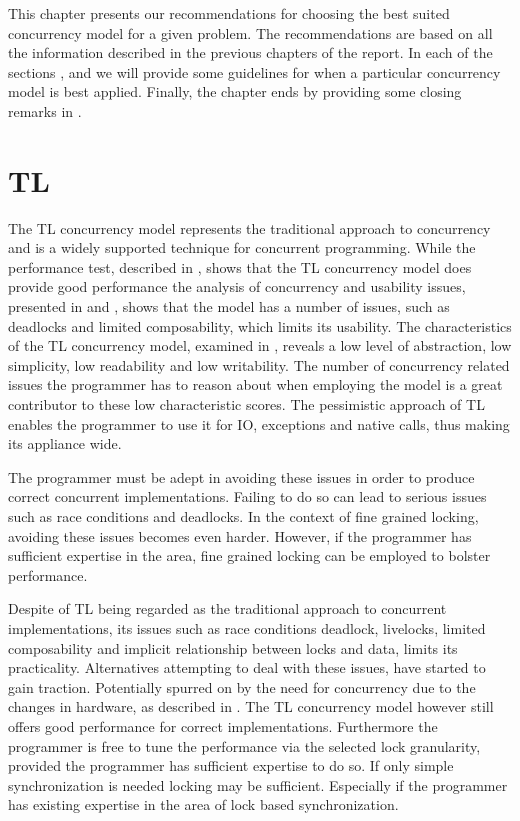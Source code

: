 \makeatletter {}\makeatother
{}
This chapter presents our recommendations for choosing the best suited concurrency model for a given problem. The recommendations are based on all the information described in the previous chapters of the report. In each of the sections ,  and  we will provide some guidelines for when a particular concurrency model is best applied. Finally, the chapter ends by providing some closing remarks in .
\label{chap:choosing_con_model}

\section{\acl{TL}}\label{sec:choose_TL}
The \ac{TL} concurrency model represents the traditional approach to concurrency\cite{saha2006mcrt} and is a widely supported technique for concurrent programming. While the performance test, described in , shows that the \ac{TL} concurrency model does provide good performance the analysis of concurrency and usability issues, presented in  and , shows that the model has a number of issues, such as deadlocks and limited composability, which limits its usability. The characteristics of the \ac{TL} concurrency model, examined in , reveals a low level of abstraction, low simplicity, low readability and low writability. The number of concurrency related issues the programmer has to reason about when employing the model is a great contributor to these low characteristic scores. The pessimistic approach of \ac{TL} enables the programmer to use it for \ac{IO}, exceptions and native calls, thus making its appliance wide.

The programmer must be adept in avoiding these issues in order to produce correct concurrent implementations. Failing to do so can lead to serious issues such as race conditions and deadlocks. In the context of fine grained locking, avoiding these issues becomes even harder. However, if the programmer has sufficient expertise in the area, fine grained locking can be employed to bolster performance. 

Despite of \ac{TL} being regarded as the traditional approach to concurrent implementations, its issues such as race conditions deadlock, livelocks, limited composability and implicit relationship between locks and data, limits its practicality. Alternatives attempting to deal with these issues, have started to gain traction. Potentially spurred on by the need for concurrency due to the changes in hardware, as described in . The \ac{TL} concurrency model however still offers good performance for correct implementations. Furthermore the programmer is free to tune the performance via the selected lock granularity, provided the programmer has sufficient expertise to do so. If only simple synchronization is needed locking may be sufficient. Especially if the programmer has existing expertise in the area of lock based synchronization. 

